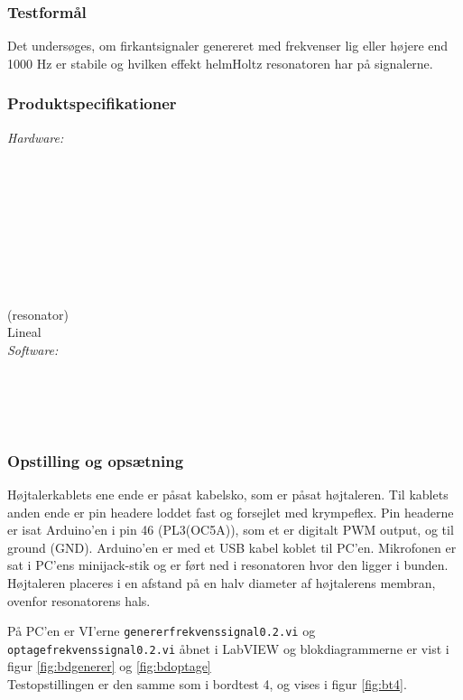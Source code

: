 {		\subsubsection{Testformål}
		Det undersøges, om firkantsignaler genereret med frekvenser lig eller højere end 1000 Hz er stabile og hvilken effekt helmHoltz resonatoren har på signalerne. 
		
		\subsubsection{Produktspecifikationer}
		
		\textit{Hardware:}\\
		\tores\\
		\\
		\kabelsko\\
		\pins\\
		\krympeflex\\
		\arduino\\
		\mikrofon\\
		\PC\\
		\usbkabel\\
		 (resonator)\\
		Lineal\\
	
		\textit{Software:}\\
		\labview\\
		\visa\\
		\vi\\
		\ardsw\\
		
		
		\subsubsection{Opstilling og opsætning}
		
		Højtalerkablets ene ende er påsat kabelsko, som er påsat højtaleren. Til kablets anden ende er pin headere loddet fast og forsejlet med krympeflex. Pin headerne er isat Arduino'en i pin 46 (PL3(OC5A)), som et er digitalt PWM output, og til ground (GND). 
		Arduino'en er med et USB kabel koblet til PC'en.	
		Mikrofonen er sat i PC'ens minijack-stik og er ført ned i resonatoren hvor den ligger i bunden. Højtaleren placeres i en afstand på en halv diameter af højtalerens membran, ovenfor resonatorens hals. 
		
		På PC'en er VI'erne \texttt{genererfrekvenssignal0.2.vi} og \texttt{optagefrekvenssignal0.2.vi} åbnet i LabVIEW og blokdiagrammerne er vist i figur \ref{fig:bdgenerer} og \ref{fig:bdoptage} \\ Testopstillingen er den samme som i bordtest 4, og vises i figur \ref{fig:bt4}.  
		

}
